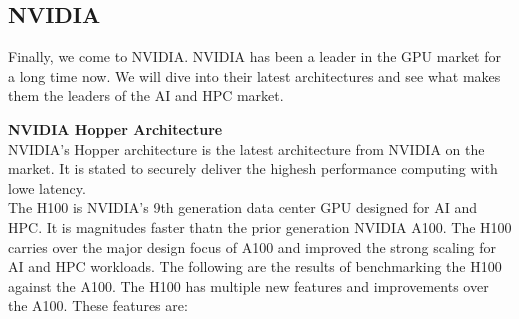 \documentclass[12pt]{article}
\begin{document}
\subsection{NVIDIA}
Finally, we come to NVIDIA. NVIDIA has been a leader in the GPU market for a long time now. We will dive into their latest architectures and see what makes them the leaders of the AI and HPC market.

\textbf{NVIDIA Hopper Architecture}\\
NVIDIA's Hopper architecture is the latest architecture from NVIDIA on the market. It is stated to securely deliver the highesh performance computing with lowe latency.\\
The H100 is NVIDIA's 9th generation data center GPU designed for AI and HPC. It is magnitudes faster thatn the prior generation NVIDIA A100. The H100 carries over the major design focus of A100 and improved the strong scaling for AI and HPC workloads. The following are the results of benchmarking the H100 against the A100.
The H100 has multiple new features and improvements over the A100.
These features are:
\end{document}
